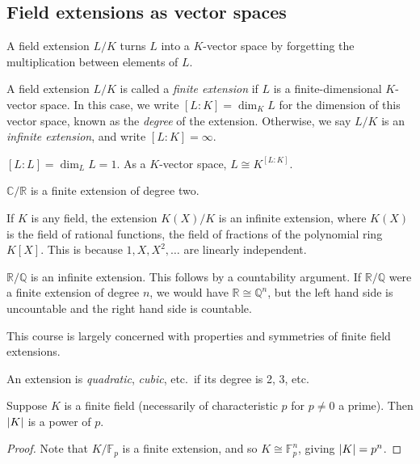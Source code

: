\subsection{Field extensions as vector spaces}
\begin{remark}
	A field extension \( L / K \) turns \( L \) into a \( K \)-vector space by forgetting the multiplication between elements of \( L \).
\end{remark}
\begin{definition}
	A field extension \( L / K \) is called a \emph{finite extension} if \( L \) is a finite-dimensional \( K \)-vector space.
	In this case, we write \( [L:K] = \dim_K L \) for the dimension of this vector space, known as the \emph{degree} of the extension.
	Otherwise, we say \( L / K \) is an \emph{infinite extension}, and write \( [L:K] = \infty \).
\end{definition}
\begin{remark}
	\( [L:L] = \dim_L L = 1 \).
	As a \( K \)-vector space, \( L \cong K^{[L:K]} \).
\end{remark}
\begin{example}
	\( \mathbb C / \mathbb R \) is a finite extension of degree two.

	If \( K \) is any field, the extension \( K(X) / K \) is an infinite extension, where \( K(X) \) is the field of rational functions, the field of fractions of the polynomial ring \( K[X] \).
	This is because \( 1, X, X^2, \dots \) are linearly independent.

	\( \mathbb R / \mathbb Q \) is an infinite extension.
	This follows by a countability argument.
	If \( \mathbb R / \mathbb Q \) were a finite extension of degree \( n \), we would have \( \mathbb R \cong \mathbb Q^n \), but the left hand side is uncountable and the right hand side is countable.
\end{example}
This course is largely concerned with properties and symmetries of finite field extensions.
\begin{definition}
	An extension is \emph{quadratic}, \emph{cubic}, etc.\ if its degree is 2, 3, etc.
\end{definition}
\begin{proposition}
	Suppose \( K \) is a finite field (necessarily of characteristic \( p \) for \( p \neq 0 \) a prime).
	Then \( \abs{K} \) is a power of \( p \).
\end{proposition}
\begin{proof}
	Note that \( K / \mathbb F_p \) is a finite extension, and so \( K \cong \mathbb F_p^n \), giving \( \abs{K} = p^n \).
\end{proof}
